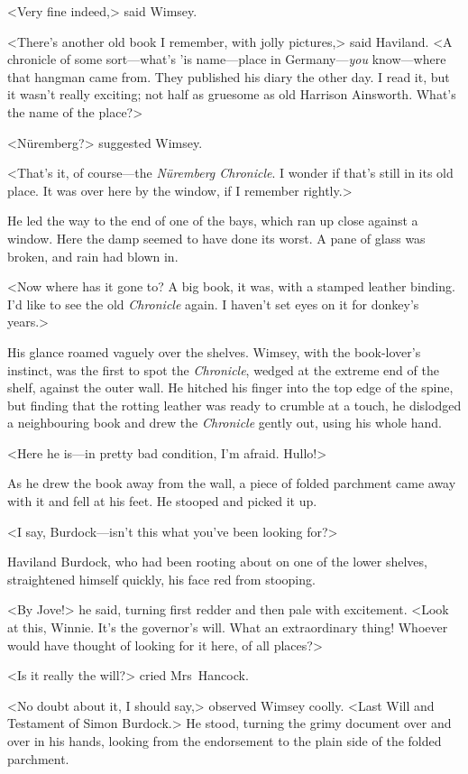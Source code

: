 <Very fine indeed,> said Wimsey.

<There's another old book I remember, with jolly pictures,> said Haviland. <A chronicle of some sort—what's 'is name—place in Germany—\textit{you} know—where that hangman came from. They published his diary the other day. I read it, but it wasn't really exciting; not half as gruesome as old Harrison Ainsworth. What's the name of the place?>

<Nüremberg?> suggested Wimsey.

<That's it, of course—the \textit{Nüremberg \textit{Chronicle}}. I wonder if that's still in its old place. It was over here by the window, if I remember rightly.>

He led the way to the end of one of the bays, which ran up close against a window. Here the damp seemed to have done its worst. A pane of glass was broken, and rain had blown in.

<Now where has it gone to? A big book, it was, with a stamped leather binding. I'd like to see the old \textit{\textit{Chronicle}} again. I haven't set eyes on it for donkey's years.>

His glance roamed vaguely over the shelves. Wimsey, with the book-lover's instinct, was the first to spot the \textit{\textit{Chronicle}}, wedged at the extreme end of the shelf, against the outer wall. He hitched his finger into the top edge of the spine, but finding that the rotting leather was ready to crumble at a touch, he dislodged a neighbouring book and drew the \textit{\textit{Chronicle}} gently out, using his whole hand.

<Here he is—in pretty bad condition, I'm afraid. Hullo!>

As he drew the book away from the wall, a piece of folded parchment came away with it and fell at his feet. He stooped and picked it up.

<I say, Burdock—isn't this what you've been looking for?>

Haviland Burdock, who had been rooting about on one of the lower shelves, straightened himself quickly, his face red from stooping.

<By Jove!> he said, turning first redder and then pale with excitement. <Look at this, Winnie. It's the governor's will. What an extraordinary thing! Whoever would have thought of looking for it here, of all places?>

<Is it really the will?> cried Mrs~Hancock.

<No doubt about it, I should say,> observed Wimsey coolly. <Last Will and Testament of Simon Burdock.> He stood, turning the grimy document over and over in his hands, looking from the endorsement to the plain side of the folded parchment.


